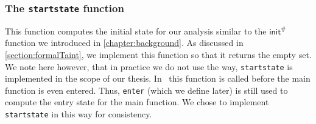       \subsubsection{The \texttt{startstate} function}
        This function computes the initial state for our analysis similar to the $\textsf{init}^{\#}$ function we introduced in \autoref{chapter:background}. As discussed in \autoref{section:formalTaint}, we implement this function so that it returns the empty set.\\
        We note here however, that in practice we do not use the way, \texttt{startstate} is implemented in the scope of our thesis. In \gob\ this function is called before the main function is even entered. Thus, \texttt{enter} (which we define later) is still used to compute the entry state for the main function. We chose to implement \texttt{startstate} in this way for consistency.

